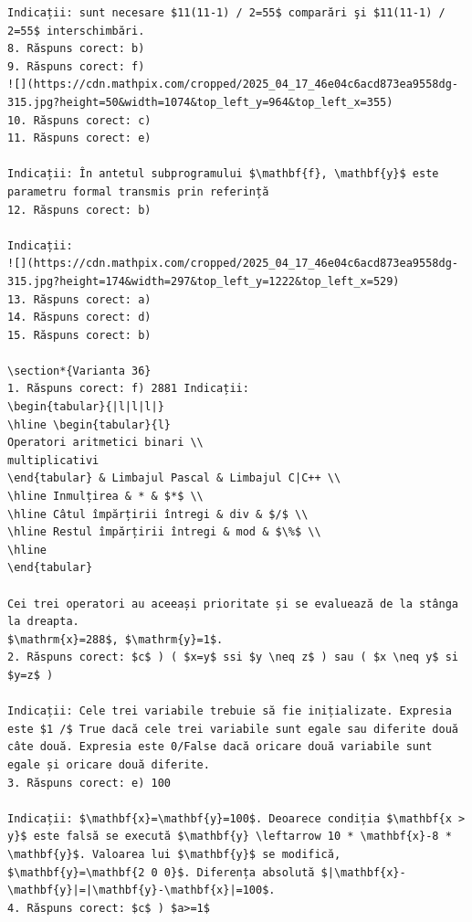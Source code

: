 \documentclass[10pt]{article}
\begin{document}
\begin{verbatim}
Indicații: sunt necesare $11(11-1) / 2=55$ comparări şi $11(11-1) / 2=55$ interschimbări.
8. Răspuns corect: b)
9. Răspuns corect: f)
![](https://cdn.mathpix.com/cropped/2025_04_17_46e04c6acd873ea9558dg-315.jpg?height=50&width=1074&top_left_y=964&top_left_x=355)
10. Răspuns corect: c)
11. Răspuns corect: e)

Indicații: În antetul subprogramului $\mathbf{f}, \mathbf{y}$ este parametru formal transmis prin referință
12. Răspuns corect: b)

Indicații:
![](https://cdn.mathpix.com/cropped/2025_04_17_46e04c6acd873ea9558dg-315.jpg?height=174&width=297&top_left_y=1222&top_left_x=529)
13. Răspuns corect: a)
14. Răspuns corect: d)
15. Răspuns corect: b)

\section*{Varianta 36}
1. Răspuns corect: f) 2881 Indicații:
\begin{tabular}{|l|l|l|}
\hline \begin{tabular}{l} 
Operatori aritmetici binari \\
multiplicativi
\end{tabular} & Limbajul Pascal & Limbajul C|C++ \\
\hline Inmulțirea & * & $*$ \\
\hline Câtul împărțirii întregi & div & $/$ \\
\hline Restul împărțirii întregi & mod & $\%$ \\
\hline
\end{tabular}

Cei trei operatori au aceeași prioritate și se evaluează de la stânga la dreapta.
$\mathrm{x}=288$, $\mathrm{y}=1$.
2. Răspuns corect: $c$ ) ( $x=y$ ssi $y \neq z$ ) sau ( $x \neq y$ si $y=z$ )

Indicații: Cele trei variabile trebuie să fie inițializate. Expresia este $1 /$ True dacă cele trei variabile sunt egale sau diferite două câte două. Expresia este 0/False dacă oricare două variabile sunt egale și oricare două diferite.
3. Răspuns corect: e) 100

Indicații: $\mathbf{x}=\mathbf{y}=100$. Deoarece condiția $\mathbf{x > y}$ este falsă se execută $\mathbf{y} \leftarrow 10 * \mathbf{x}-8 * \mathbf{y}$. Valoarea lui $\mathbf{y}$ se modifică, $\mathbf{y}=\mathbf{2 0 0}$. Diferența absolută $|\mathbf{x}-\mathbf{y}|=|\mathbf{y}-\mathbf{x}|=100$.
4. Răspuns corect: $c$ ) $a>=1$


\end{verbatim}
\end{document}
